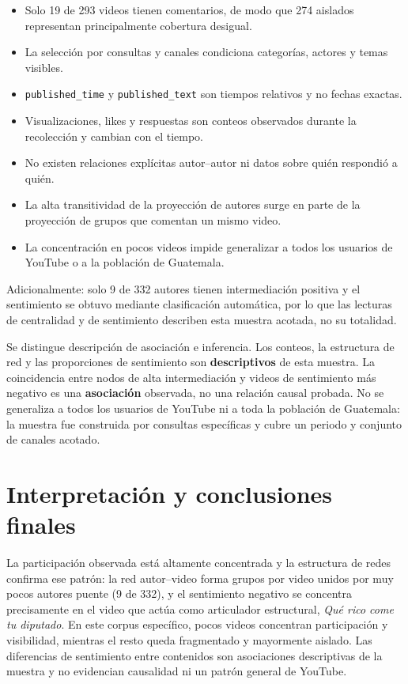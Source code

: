 \documentclass[11pt]{article}
\begin{document}
\begin{itemize}
  \item Solo 19 de 293 videos tienen comentarios, de modo que 274 aislados representan principalmente cobertura desigual.
  \item La selección por consultas y canales condiciona categorías, actores y temas visibles.
  \item \texttt{published\_time} y \texttt{published\_text} son tiempos relativos y no fechas exactas.
  \item Visualizaciones, likes y respuestas son conteos observados durante la recolección y cambian con el tiempo.
  \item No existen relaciones explícitas autor--autor ni datos sobre quién respondió a quién.
  \item La alta transitividad de la proyección de autores surge en parte de la proyección de grupos que comentan un mismo video.
  \item La concentración en pocos videos impide generalizar a todos los usuarios de YouTube o a la población de Guatemala.
\end{itemize}

Adicionalmente: solo 9 de 332 autores tienen intermediación positiva y el sentimiento se obtuvo mediante clasificación automática, por lo que las lecturas de centralidad y de sentimiento describen esta muestra acotada, no su totalidad.

Se distingue descripción de asociación e inferencia. Los conteos, la estructura de red y las proporciones de sentimiento son \textbf{descriptivos} de esta muestra. La coincidencia entre nodos de alta intermediación y videos de sentimiento más negativo es una \textbf{asociación} observada, no una relación causal probada. No se generaliza a todos los usuarios de YouTube ni a toda la población de Guatemala: la muestra fue construida por consultas específicas y cubre un periodo y conjunto de canales acotado.

\section{Interpretación y conclusiones finales}

La participación observada está altamente concentrada y la estructura de redes confirma ese patrón: la red autor--video forma grupos por video unidos por muy pocos autores puente (9 de 332), y el sentimiento negativo se concentra precisamente en el video que actúa como articulador estructural, \emph{Qué rico come tu diputado}. En este corpus específico, pocos videos concentran participación y visibilidad, mientras el resto queda fragmentado y mayormente aislado. Las diferencias de sentimiento entre contenidos son asociaciones descriptivas de la muestra y no evidencian causalidad ni un patrón general de YouTube.
\end{document}
